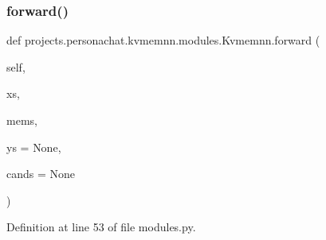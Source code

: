 \subsubsection{\texorpdfstring{forward()}{forward()}}
{\footnotesize\ttfamily def projects.\+personachat.\+kvmemnn.\+modules.\+Kvmemnn.\+forward (\begin{DoxyParamCaption}\item[{}]{self,  }\item[{}]{xs,  }\item[{}]{mems,  }\item[{}]{ys = {\ttfamily None},  }\item[{}]{cands = {\ttfamily None} }\end{DoxyParamCaption})}



Definition at line 53 of file modules.\+py.


